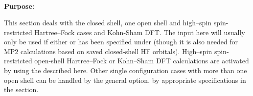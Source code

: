 \pagebreak[3]
\subsection{\label{ref-rhfinp}}

{\bf Purpose:}

This section deals with the closed shell, one open shell and
high--spin spin-restricted 
Hartree--Fock cases
and Kohn-Sham DFT. 
The input here will usually only be used if either
 or 
has been specified under 
(though it is also needed for MP2 calculations based on saved closed-shell HF
orbitals).
High--spin spin-restricted open-shell Hartree--Fock or Kohn--Sham DFT calculations are activated by
using the  described here.
Other single configuration cases with more than one open shell
can be handled by the general  option, by appropriate specifications
in the  section.

